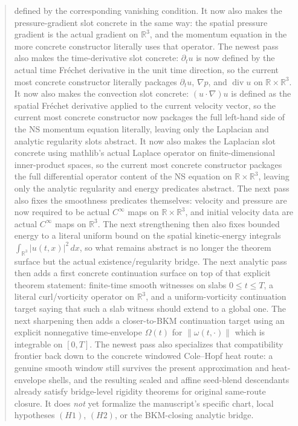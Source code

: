 \documentclass[11pt]{article}
\begin{document}
\begin{abstract}
defined by the corresponding vanishing condition.  It now also makes the
pressure-gradient slot concrete in the same way: the spatial pressure gradient
is the actual gradient on \(\mathbb{R}^3\), and the momentum equation in the
more concrete constructor literally uses that operator.  The newest pass also
makes the time-derivative slot concrete: \(\partial_t u\) is now defined by the
actual time Fr\'echet derivative in the unit time direction, so the current most
concrete constructor literally packages \(\partial_t u\), \(\nabla p\), and
\(\operatorname{div} u\) on \(\mathbb{R} \times \mathbb{R}^3\).  It now also
makes the convection slot concrete: \((u \cdot \nabla)u\) is defined as the
spatial Fr\'echet derivative applied to the current velocity vector, so the
current most concrete constructor now packages the full left-hand side of the
NS momentum equation literally, leaving only the Laplacian and analytic
regularity slots abstract.  It now also makes the Laplacian slot concrete using
mathlib's actual Laplace operator on finite-dimensional inner-product spaces,
so the current most concrete constructor packages the full differential
operator content of the NS equation on \(\mathbb{R} \times \mathbb{R}^3\),
leaving only the analytic regularity and energy predicates abstract.  The
next pass also fixes the smoothness predicates themselves: velocity and pressure
are now required to be actual \(C^\infty\) maps on \(\mathbb{R} \times
\mathbb{R}^3\), and initial velocity data are actual \(C^\infty\) maps on
\(\mathbb{R}^3\).  The next strengthening then also fixes bounded energy to a
literal uniform bound on the spatial kinetic-energy integrals
\(\int_{\mathbb{R}^3} |u(t,x)|^2\,dx\), so what remains abstract is no longer the
theorem surface but the actual existence/regularity bridge.  The
next analytic pass then adds a first concrete continuation surface on top of
that explicit theorem statement: finite-time smooth witnesses on slabs
\(0 \le t \le T\), a literal curl/vorticity operator on \(\mathbb{R}^3\), and a
uniform-vorticity continuation target saying that such a slab witness should
extend to a global one.  The next sharpening then adds a closer-to-BKM
continuation target using an explicit nonnegative time-envelope \(\Omega(t)\)
for \(\|\omega(t,\cdot)\|\) which is integrable on \([0,T]\).  The
newest pass also specializes that compatibility frontier back down
to the concrete windowed Cole--Hopf heat route: a genuine smooth window still
survives the present approximation and heat-envelope shells, and the resulting
scaled and affine seed-blend descendants already satisfy bridge-level rigidity
theorems for original same-route closure.  It does \emph{not} yet formalize
the manuscript's specific chart,
local hypotheses \((H1)\), \((H2)\), or the BKM-closing analytic bridge.
\end{abstract}
\end{document}
